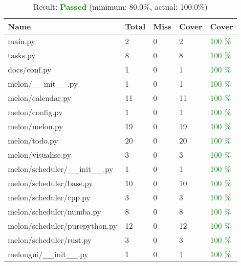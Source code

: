 \begin{table}
  \centering
  \caption{Result: \textcolor{green}{\bf Passed} (minimum: 80.0\%, actual: 100.0\%)}
  \begin{tabular}{lllll}
    \hline
    \bf Name                        & \bf Total & \bf Miss & \bf Cover & \bf Cover                 \\
    \hline
    main.py                         & 2         & 0        & 2         & \textcolor{green}{100 \%} \\
    tasks.py                        & 8         & 0        & 8         & \textcolor{green}{100 \%} \\
    docs/conf.py                    & 1         & 0        & 1         & \textcolor{green}{100 \%} \\
    melon/\_\_init\_\_.py           & 1         & 0        & 1         & \textcolor{green}{100 \%} \\
    melon/calendar.py               & 11        & 0        & 11        & \textcolor{green}{100 \%} \\
    melon/config.py                 & 1         & 0        & 1         & \textcolor{green}{100 \%} \\
    melon/melon.py                  & 19        & 0        & 19        & \textcolor{green}{100 \%} \\
    melon/todo.py                   & 20        & 0        & 20        & \textcolor{green}{100 \%} \\
    melon/visualise.py              & 3         & 0        & 3         & \textcolor{green}{100 \%} \\
    melon/scheduler/\_\_init\_\_.py & 1         & 0        & 1         & \textcolor{green}{100 \%} \\
    melon/scheduler/base.py         & 10        & 0        & 10        & \textcolor{green}{100 \%} \\
    melon/scheduler/cpp.py          & 3         & 0        & 3         & \textcolor{green}{100 \%} \\
    melon/scheduler/numba.py        & 8         & 0        & 8         & \textcolor{green}{100 \%} \\
    melon/scheduler/purepython.py   & 12        & 0        & 12        & \textcolor{green}{100 \%} \\
    melon/scheduler/rust.py         & 3         & 0        & 3         & \textcolor{green}{100 \%} \\
    melongui/\_\_init\_\_.py        & 1         & 0        & 1         & \textcolor{green}{100 \%} \\

\end{tabular}
\end{table}
